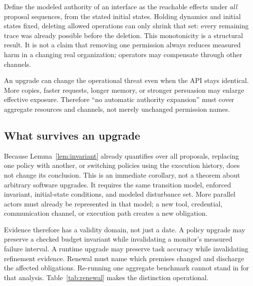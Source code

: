  Define the modeled authority of an interface as the reachable effects under \emph{all} proposal sequences, from the stated initial states. Holding dynamics and initial states fixed, deleting allowed operations can only shrink that set: every remaining trace was already possible before the deletion. This monotonicity is a structural result. It is not a claim that removing one permission always reduces measured harm in a changing real organization; operators may compensate through other channels.

An upgrade can change the operational threat even when the API stays identical. More copies, faster requests, longer memory, or stronger persuasion may enlarge effective exposure. Therefore ``no automatic authority expansion'' must cover aggregate resources and channels, not merely unchanged permission names.



\subsection{What survives an upgrade}
\label{sec:upgrade}
Because Lemma~\ref{lem:invariant} already quantifies over all proposals, replacing one policy with another, or switching policies using the execution history, does not change its conclusion. This is an immediate corollary, not a theorem about arbitrary software upgrades. It requires the same transition model, enforced invariant, initial-state conditions, and modeled disturbance set. More parallel actors must already be represented in that model; a new tool, credential, communication channel, or execution path creates a new obligation.

Evidence therefore has a validity domain, not just a date. A policy upgrade may preserve a checked budget invariant while invalidating a monitor's measured failure interval. A runtime upgrade may preserve task accuracy while invalidating refinement evidence. Renewal must name which premises changed and discharge the affected obligations. Re-running one aggregate benchmark cannot stand in for that analysis. Table~\ref{tab:renewal} makes the distinction operational.

